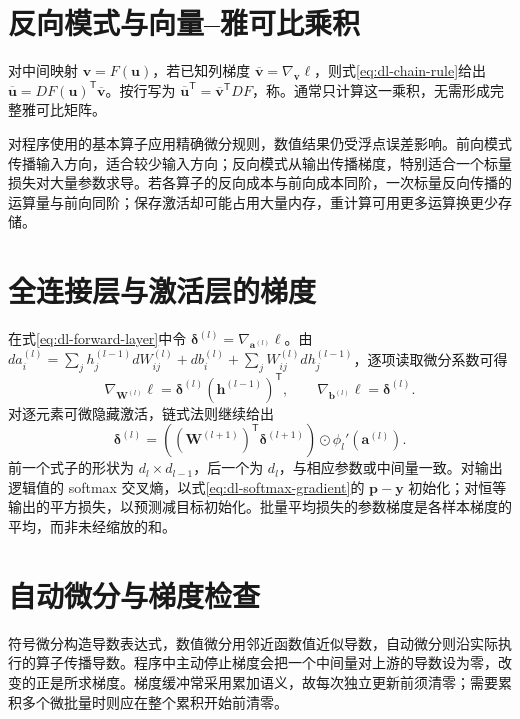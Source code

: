 \documentclass[UTF8,12pt,a4paper,fontset=fandol]{ctexbook}
\begin{document}
\section{反向模式与向量--雅可比乘积}
对中间映射 $\mathbf v=F(\mathbf u)$，若已知列梯度 $\overline{\mathbf v}=\nabla_{\mathbf v}\ell$，则式\eqref{eq:dl-chain-rule}给出 $\overline{\mathbf u}=DF(\mathbf u)^\mathsf T\overline{\mathbf v}$。按行写为 $\overline{\mathbf u}^\mathsf T=\overline{\mathbf v}^\mathsf TDF$，称。通常只计算这一乘积，无需形成完整雅可比矩阵。

对程序使用的基本算子应用精确微分规则，数值结果仍受浮点误差影响。前向模式传播输入方向，适合较少输入方向；反向模式从输出传播梯度，特别适合一个标量损失对大量参数求导。若各算子的反向成本与前向成本同阶，一次标量反向传播的运算量与前向同阶；保存激活却可能占用大量内存，重计算可用更多运算换更少存储。

\section{全连接层与激活层的梯度}
在式\eqref{eq:dl-forward-layer}中令 $\boldsymbol\delta^{(l)}=\nabla_{\mathbf a^{(l)}}\ell$。由 $da_i^{(l)}=\sum_jh_j^{(l-1)}dW_{ij}^{(l)}+db_i^{(l)}+\sum_jW_{ij}^{(l)}dh_j^{(l-1)}$，逐项读取微分系数可得
\begin{equation}
\nabla_{\mathbf W^{(l)}}\ell=\boldsymbol\delta^{(l)}(\mathbf h^{(l-1)})^\mathsf T,
\qquad \nabla_{\mathbf b^{(l)}}\ell=\boldsymbol\delta^{(l)}.
\label{eq:dl-layer-gradients}
\end{equation}
对逐元素可微隐藏激活，链式法则继续给出
\begin{equation}
\boldsymbol\delta^{(l)}=((\mathbf W^{(l+1)})^\mathsf T\boldsymbol\delta^{(l+1)})\odot\phi_l'(\mathbf a^{(l)}).
\label{eq:dl-backprop-recursion}
\end{equation}
前一个式子的形状为 $d_l\times d_{l-1}$，后一个为 $d_l$，与相应参数或中间量一致。对输出逻辑值的 softmax 交叉熵，以式\eqref{eq:dl-softmax-gradient}的 $\mathbf p-\mathbf y$ 初始化；对恒等输出的平方损失，以预测减目标初始化。批量平均损失的参数梯度是各样本梯度的平均，而非未经缩放的和。

\section{自动微分与梯度检查}
符号微分构造导数表达式，数值微分用邻近函数值近似导数，自动微分则沿实际执行的算子传播导数。程序中主动停止梯度会把一个中间量对上游的导数设为零，改变的正是所求梯度。梯度缓冲常采用累加语义，故每次独立更新前须清零；需要累积多个微批量时则应在整个累积开始前清零。
\end{document}
